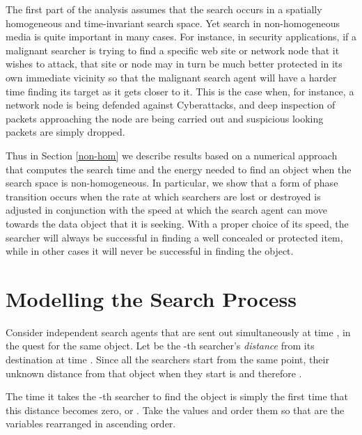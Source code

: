 \documentclass[journal]{IEEEtran}
\begin{document}
The first part of the analysis assumes that the search occurs in a spatially homogeneous and time-invariant
search space. Yet search in non-homogeneous media is quite important in many cases.
For instance, in security applications, if a malignant searcher is trying to find a specific web site or network node that it wishes to attack, that site or node may
in turn be much better protected in its own immediate vicinity so that the malignant search agent will have a harder time finding its target as it gets closer to it.
This is the case when, for instance, a network node is being defended against Cyberattacks, and
deep inspection of packets approaching the node are being carried out and suspicious looking packets are simply dropped.

Thus  in Section \ref{non-hom} we describe results based on a numerical approach that computes the search time and the energy needed to find an object when the search space is non-homogeneous. In particular,
we show that a form of phase transition occurs when the
rate at which searchers are lost or destroyed is adjusted in conjunction with the speed at which the
search agent can move towards the data object that it is seeking. With a proper choice of its speed, the searcher will always be successful in finding a well concealed or protected item,
while in other cases it will never be successful in finding the object.

\section{Modelling the Search Process}\label{model}




Consider  independent search agents that are sent out simultaneously at time , in the quest for the same object. Let  be the -th searcher's {\em distance} from its destination at time . Since all the searchers start from the same point, their unknown distance from that object when they start is  and therefore  .

The time it takes the -th searcher to  find the object is simply the first time that this distance  becomes zero, or . Take the  values  and order them so that  are  the variables  rearranged in ascending order.
\end{document}
